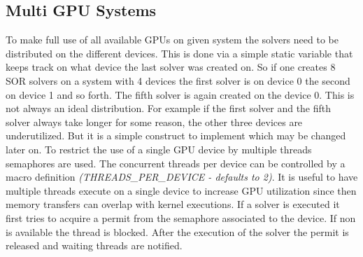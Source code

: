 \documentclass[master.tex]{subfiles}
\begin{document}
\subsection{Multi GPU Systems}
To make full use of all available GPUs on given system the solvers need to be distributed on the different devices. This is done via a simple static variable that keeps track on what device the last solver was created on. So if one creates 8 \ac{SOR} solvers on a system with 4 devices the first solver is on device 0 the second on device 1 and so forth. The fifth solver is again created on the device 0. This is not always an ideal distribution. For example if the first solver and the fifth solver always take longer for some reason, the other three devices are underutilized. But it is a simple construct to implement which may be changed later on.\newline
To restrict the use of a single GPU device by multiple threads semaphores are used. The concurrent threads per device can be controlled by a macro definition \textit{(THREADS\_PER\_DEVICE - defaults to 2)}. It is useful to have multiple threads execute on a single device to increase GPU utilization since then memory transfers can overlap with kernel executions. If a solver is executed it first tries to acquire a permit from the semaphore associated to the device. If non is available the thread is blocked. After the execution of the solver the permit is released and waiting threads are notified.
\end{document}
